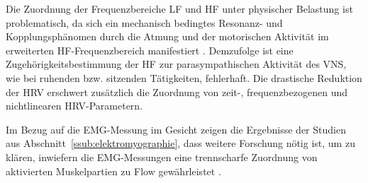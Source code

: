 Die Zuordnung der Frequenzbereiche \acs{LF} und \acs{HF} unter physischer Belastung ist problematisch, da sich ein mechanisch bedingtes Resonanz- und Kopplungsphänomen durch die Atmung und der motorischen Aktivität im erweiterten \acs{HF}-Frequenzbereich manifestiert \citep[][S.~62]{Hoos2010}. Demzufolge ist eine Zugehörigkeitsbestimmung der \acs{HF} zur parasympathischen Aktivität des \ac{VNS}, wie bei ruhenden bzw. sitzenden Tätigkeiten, fehlerhaft. Die drastische Reduktion der \acs{HRV} erschwert zusätzlich die Zuordnung von zeit-, frequenzbezogenen und nichtlinearen \acs{HRV}-Parametern.

Im Bezug auf die \ac{EMG}-Messung im Gesicht zeigen die Ergebnisse der Studien aus Abschnitt~\ref{ssub:elektromyographie}, dass weitere Forschung nötig ist, um zu klären, inwiefern die \ac{EMG}-Messungen eine trennscharfe Zuordnung von aktivierten Muskelpartien zu Flow gewährleistet \citep{Peifer2012}.

